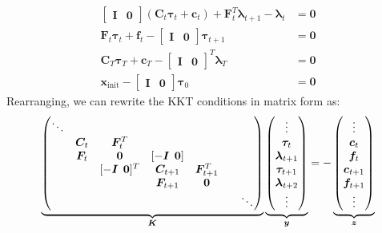 \documentclass[a4paper,11pt]{article}
\renewcommand\b\bm
\begin{document}
\begin{align}
    \label{eq:kkt_equations}
    \begin{bmatrix} \b{I} & \b{0} \end{bmatrix}
    (\b{C}_t \b{\tau}_t + \b{c}_t) +  \b{F}_t^T\b{\lambda}_{t+1} -
    \b{\lambda}_{t}
                   & = \b{0} \\
    \b{F}_t \b{\tau}_t + \b{f}_t -
    \begin{bmatrix} \b{I} & \b{0}\end{bmatrix}
    \b{\tau}_{t+1} & = \b{0} \\
    \b{C}_{T} \b{\tau}_{T} + \b{c}_{T} -
    \begin{bmatrix}  \b{I} & \b{0} \end{bmatrix}^T \b{\lambda}_{T}
                   & = \b{0} \\
    \b{x}_{\text{init}} -
    \begin{bmatrix} \b{I} & \b{0}\end{bmatrix}
    \b{\tau}_{0}   & = \b{0}
\end{align}
%
Rearranging, we can rewrite the KKT conditions in matrix form as:
%
\begin{equation}
    \label{eq:KKT}
    \underbrace{%
        \begin{pmatrix}
            \ddots &         &                                                                             \\
                   & \b{C}_t & \b{F}_t^T              &                       &                            \\
                   & \b{F}_t & \b{0}                  & [-\b{I} \; \, \b{0} ] &               &            \\
                   &         & [-\b{I} \; \, \b{0}]^T & \b{C}_{t+1}           & \b{F}^T_{t+1} &            \\
                   &         &                        & \b{F}_{t+1}           & \b{0}                      \\
                   &         &                        &                       &               &   & \ddots
        \end{pmatrix}}_{\b{K}}
    \underbrace{\begin{pmatrix}
            \vdots            \\
            \b{\tau}_t        \\
            \b{\lambda}_{t+1} \\
            \b{\tau}_{t+1}    \\
            \b{\lambda}_{t+2} \\
            \vdots
        \end{pmatrix}}_{\b{y}}
    = - \underbrace{\begin{pmatrix}
            \vdots      \\
            \b{c}_t     \\
            \b{f}_t     \\
            \b{c}_{t+1} \\
            \b{f}_{t+1} \\
            \vdots
        \end{pmatrix}}_{\b{z}}
\end{equation}
\end{document}
